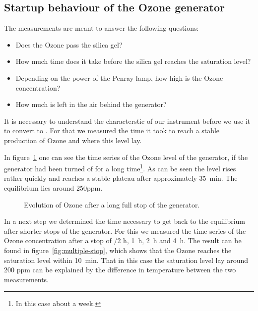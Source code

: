 \subsection{Startup behaviour of the Ozone generator}
\label{sec:ozone}

The measurements are meant to answer the following questions:
\begin{itemize}
\item Does the Ozone pass the silica gel?
\item How much time does it take before the silica gel reaches the
  saturation level?
\item Depending on the power of the Penray lamp, how high is the Ozone
  concentration?
\item How much  is left in the air behind the generator?
\end{itemize}

It is necessary to understand the characterstic of our instrument
before we use it to convert  to . For that we measured
the time it took to reach a stable production of Ozone and where this
level lay. 

In figure~\ref{fig:long-stop} one can see the time series of the Ozone
level of the generator, if the generator had been turned of for a long
time\footnote{In this case about a week.}. As can be seen the level
rises rather quickly and reaches a stable plateau after approximately
\SI{35}{\minute}. The equilibrium lies around 250ppm.

\begin{figure}[htbp]
  \centering
  \caption{Evolution of Ozone after a long full stop of the
    generator.}
  \label{fig:long-stop}
\end{figure}

In a next step we determined the time necessary to get back to the
equilibrium after shorter stops of the generator. For this we measured
the time series of the Ozone concentration after a stop of {/2} \si{\hour}, \SI{1}{\hour}, \SI{2}{\hour} and \SI{4}{\hour}. The
result can be found in figure~\ref{fig:multiple-stop}, which shows
that the Ozone reaches the saturation level within
\SI{10}{\minute}. That in this case the saturation level lay around
200 ppm can be explained by the difference in temperature between the
two measurements. 

